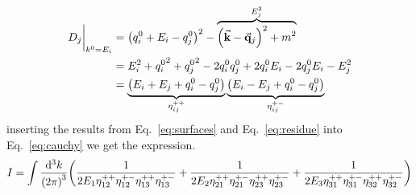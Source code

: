 \newcommand{\ELIPT}[2]{\eta_{#1#2}^{++}}
\newcommand{\HYPER}[2]{\eta_{#1#2}^{+-}}
\begin{align}
    \eval{D_j}_{k^0=E_i} &= {\qty(q^0_i+E_i-q^0_j)}^2 - \overbrace{{\qty(\va{k}-\va{q}_j)}^2+m^2}^{E_j^2}\\
    &= E_i^2+{q_i^0}^2+{q_j^0}^2-2q_i^0q_j^0+2q_i^0E_i - 2q_j^0E_i-E_j^2\\
    &= \underbrace{\left(E_i+E_j+q_i^0-q_j^0\right)}_{\ELIPT{i}{j}}\underbrace{\left(E_i-E_j+q_i^0-q_j^0\right)}_{\HYPER{i}{j}} \label{eq:surfaces}
\end{align}
inserting the results from Eq.~\eqref{eq:surfaces} and Eq.~\eqref{eq:residue} into Eq.~\eqref{eq:cauchy} we get the expression.
\newcommand{\BLTD}[3]{2E_{#1}\ELIPT{#1}{#2}\HYPER{#1}{#2}\ELIPT{#1}{#3}\HYPER{#1}{#3}}
\begin{equation}
    I =  \int \frac{\dd[3]{k}}{{(2\pi)}^3}\qty(\frac{1}{\BLTD{1}{2}{3}}+\frac{1}{\BLTD{2}{1}{3}}+\frac{1}{\BLTD{3}{1}{2}})
\end{equation}
